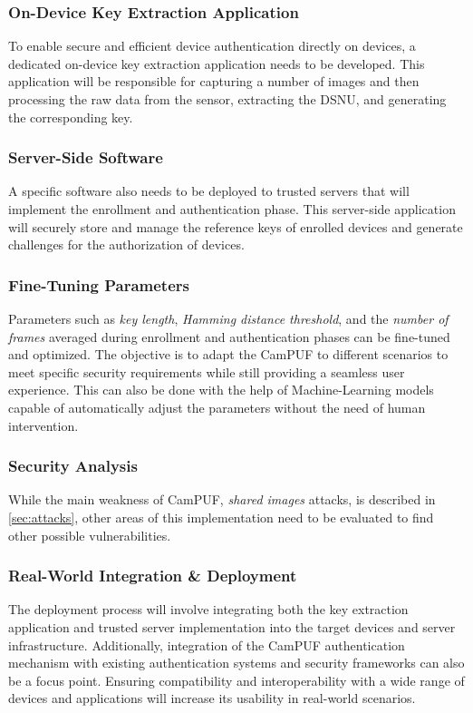 \subsubsection{On-Device Key Extraction Application}

To enable secure and efficient device authentication directly on devices, a dedicated on-device key extraction application needs to be developed. This application will be responsible for capturing a number of images and then processing the raw data from the sensor, extracting the DSNU, and generating the corresponding key.

\subsubsection{Server-Side Software}

A specific software also needs to be deployed to trusted servers that will implement the enrollment and authentication phase. This server-side application will securely store and manage the reference keys of enrolled devices and generate challenges for the authorization of devices.

\subsubsection{Fine-Tuning Parameters}

Parameters such as \emph{key length}, \emph{Hamming distance threshold}, and the \emph{number of frames} averaged during enrollment and authentication phases can be fine-tuned and optimized. The objective is to adapt the CamPUF to different scenarios to meet specific security requirements while still providing a seamless user experience. This can also be done with the help of Machine-Learning models capable of automatically adjust the parameters without the need of human intervention.

\subsubsection{Security Analysis}

While the main weakness of CamPUF, \emph{shared images} attacks, is described in \ref{sec:attacks}, other areas of this implementation need to be evaluated to find other possible vulnerabilities.

\subsubsection{Real-World Integration \& Deployment}

The deployment process will involve integrating both the key extraction application and trusted server implementation into the target devices and server infrastructure. Additionally, integration of the CamPUF authentication mechanism with existing authentication systems and security frameworks can also be a focus point. Ensuring compatibility and interoperability with a wide range of devices and applications will increase its usability in real-world scenarios.